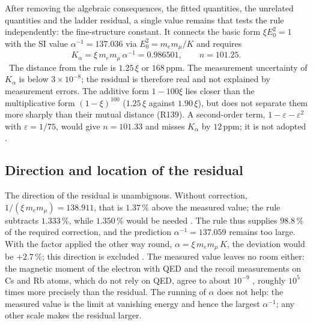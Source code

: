 After removing the algebraic consequences, the fitted quantities, the unrelated quantities and the
ladder residual, a single value remains that tests the rule independently: the fine-structure
constant. It connects the basic form $\xi E_0^2=1$ with the SI value $\alpha^{-1}=137.036$ via
$E_0^2=m_em_\mu/K$ and requires
\begin{equation}
  K_\alpha=\xi\,m_em_\mu\,\alpha^{-1}=0.986501,\qquad n=101.25 .
\end{equation}
\KM\ The distance from the rule is $1.25\,\xi$ or $168$\,ppm. The measurement uncertainty of
$K_\alpha$ is below $3\times10^{-8}$; the residual is therefore real and not explained by measurement
errors. The additive form $1-100\xi$ lies closer than the multiplicative form $(1-\xi)^{100}$
($1.25\,\xi$ against $1.90\,\xi$), but does not separate them more sharply than their mutual distance
(R139). A second-order term, $1-\varepsilon-\varepsilon^2$ with $\varepsilon=1/75$, would give
$n=101.33$ and misses $K_\alpha$ by $12$\,ppm; it is not adopted \SM.

\subsection*{Direction and location of the residual}

The direction of the residual is unambiguous. Without correction, $1/(\xi\,m_em_\mu)=138.911$, that
is $1.37\,\%$ above the measured value; the rule subtracts $1.333\,\%$, while $1.350\,\%$ would be
needed \KM. The rule thus supplies $98.8\,\%$ of the required correction, and the prediction
$\alpha^{-1}=137.059$ remains too large. With the factor applied the other way round,
$\alpha=\xi\,m_em_\mu\,K$, the deviation would be $+2.7\,\%$; this direction is excluded \XM. The
measured value leaves no room either: the magnetic moment of the electron with QED and the recoil
measurements on Cs and Rb atoms, which do not rely on QED, agree to about $10^{-9}$ \QM, roughly
$10^5$ times more precisely than the residual. The running of $\alpha$ does not help: the measured
value is the limit at vanishing energy and hence the largest $\alpha^{-1}$; any other scale makes the
residual larger.

